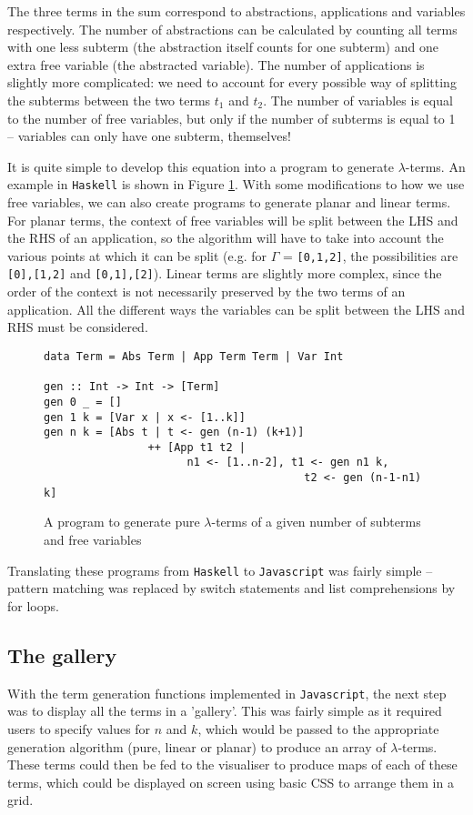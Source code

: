 \documentclass[11pt]{article}
\begin{document}
The three terms in the sum correspond to abstractions, applications and variables respectively. The number of abstractions can be calculated by counting all terms with one less subterm (the abstraction itself counts for one subterm) and one extra free variable (the abstracted variable). The number of applications is slightly more complicated: we need to account for every possible way of splitting the subterms between the two terms $t_1$ and $t_2$. The number of variables is equal to the number of free variables, but only if the number of subterms is equal to 1 -- variables can only have one subterm, themselves!

It is quite simple to develop this equation into a program to generate $\lambda$-terms. An example in \texttt{Haskell} is shown in Figure \ref{fig:gen}. With some modifications to how we use free variables, we can also create programs to generate planar and linear terms. For planar terms, the context of free variables will be split between the LHS and the RHS of an application, so the algorithm will have to take into account the various points at which it can be split (e.g. for $\Gamma$ = \texttt{[0,1,2]}, the possibilities are \texttt{[0],[1,2]} and \texttt{[0,1],[2]}). Linear terms are slightly more complex, since the order of the context is not necessarily preserved by the two terms of an application. All the different ways the variables can be split between the LHS and RHS must be considered.

\begin{figure}
\begin{verbatim}
data Term = Abs Term | App Term Term | Var Int

gen :: Int -> Int -> [Term]
gen 0 _ = []
gen 1 k = [Var x | x <- [1..k]]
gen n k = [Abs t | t <- gen (n-1) (k+1)]
                ++ [App t1 t2 | 
                      n1 <- [1..n-2], t1 <- gen n1 k, 
                                        t2 <- gen (n-1-n1) k] 
\end{verbatim}
\caption{A program to generate pure $\lambda$-terms of a given number of subterms and free variables}
\label{fig:gen}
\end{figure}

Translating these programs from \texttt{Haskell} to \texttt{Javascript} was fairly simple -- pattern matching was replaced by switch statements and list comprehensions by for loops.

\subsection{The gallery}
With the term generation functions implemented in \texttt{Javascript}, the next step was to display all the terms in a 'gallery'. This was fairly simple as it required users to specify values for $n$ and $k$, which would be passed to the appropriate generation algorithm (pure, linear or planar) to produce an array of $\lambda$-terms. These terms could then be fed to the visualiser to produce maps of each of these terms, which could be displayed on screen using basic CSS to arrange them in a grid.
\end{document}
